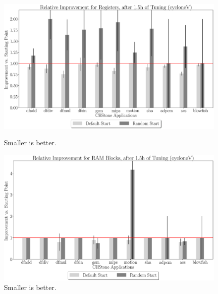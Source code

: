 \documentclass[12pt, a4paper]{article}
\begin{document}
\begin{figure}[htpb]
    \centering
    \begin{minipage}{.48\textwidth}
        \centering
        \includegraphics[width=.8\textwidth]{rel_comp_regs_5400_chstone_cycloneV}
        \caption{Smaller is better.}
    \end{minipage}%
    \begin{minipage}{.48\textwidth}
        \centering
        \includegraphics[width=.8\textwidth]{rel_comp_ram_5400_chstone_cycloneV}
        \caption{Smaller is better.}
    \end{minipage}%


\end{figure}
\end{document}
